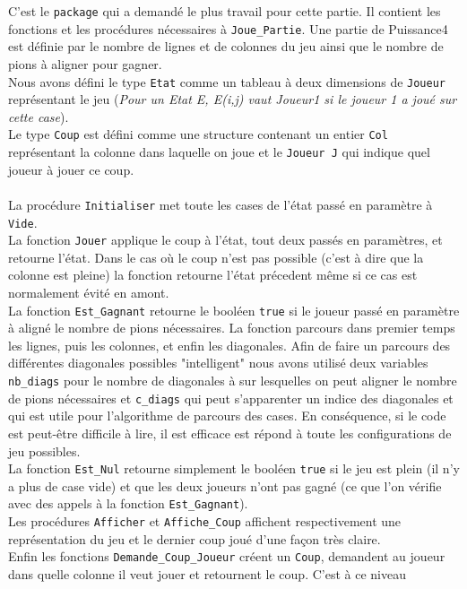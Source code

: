 \documentclass[a4paper,11pt]{article}
\begin{document}
C'est le {\tt package} qui a demandé le plus travail pour cette partie.
Il contient les fonctions et les procédures nécessaires à {\tt Joue\_Partie}.
Une partie de Puissance4 est définie par le nombre de lignes et de colonnes
du jeu ainsi que le nombre de pions à aligner pour gagner. \\
Nous avons défini le type {\tt Etat} comme un tableau à deux dimensions de
{\tt Joueur} représentant le jeu ({\it Pour un Etat E, E(i,j) vaut Joueur1 si
le joueur 1 a joué sur cette case}). \\
Le type {\tt Coup} est défini comme une structure contenant un entier {\tt Col}
représentant la colonne dans laquelle on joue et le {\tt Joueur J} qui indique
quel joueur à jouer ce coup.\\
\\
La procédure {\tt Initialiser} met toute les cases de l'état passé en paramètre
à {\tt Vide}. \\
La fonction {\tt Jouer} applique le coup à l'état, tout deux
passés en paramètres, et retourne l'état. Dans le cas où le coup n'est pas
possible (c'est à dire que la colonne est pleine) la fonction retourne l'état
précedent même si ce cas est normalement évité en amont. \\
La fonction {\tt Est\_Gagnant} retourne le booléen {\tt true} si le joueur passé
en paramètre à aligné le nombre de pions nécessaires. La fonction parcours dans
premier temps les lignes, puis les colonnes, et enfin les diagonales. Afin
de faire un parcours des différentes diagonales possibles "intelligent" nous avons
utilisé deux variables {\tt nb\_diags} pour le nombre de diagonales à sur
lesquelles on peut aligner le nombre de pions nécessaires et {\tt c\_diags}
qui peut s'apparenter un indice des diagonales et qui est utile pour
l'algorithme de parcours des cases. En conséquence, si le code est peut-être
difficile à lire, il est efficace est répond à toute les configurations de jeu
possibles.\\
La fonction {\tt Est\_Nul} retourne simplement le booléen {\tt true} si le jeu
est plein (il n'y a plus de case vide) et que les deux joueurs n'ont pas gagné
(ce que l'on vérifie avec des appels à la fonction {\tt Est\_Gagnant}). \\
Les procédures {\tt Afficher} et {\tt Affiche\_Coup} affichent respectivement
une représentation du jeu et le dernier coup joué d'une façon très claire. \\
Enfin les fonctions {\tt Demande\_Coup\_Joueur} créent un {\tt Coup}, demandent
au joueur dans quelle colonne il veut jouer et retournent le coup. C'est à ce niveau
\end{document}
